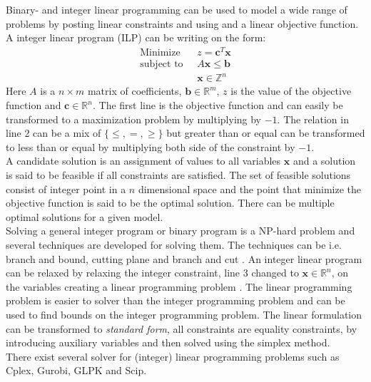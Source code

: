 Binary- and integer linear programming can be used to model a wide range of problems by posting linear constraints and 
using and a linear objective function. A integer linear program (ILP) can be writing on the form: 
\begin{align}
 \text{Minimize }\; &z =  \mathbf{c}^T\mathbf{x} \\ 
 \text{subject to } \; & A\mathbf{x} \leq \mathbf{b} \\ 
 & \mathbf{x} \in \mathbb{Z}^n
\end{align} \noindent
Here $A$ is a $n \times m$ matrix of coefficients, $\mathbf{b} \in \mathbb{R}^m$, $z$ is the value of the objective 
function and $\mathbf{c} \in \mathbb{R}^n$. The first line is the objective function and can easily be transformed to a 
maximization problem by multiplying by $-1$. The relation in line 2 can be a mix of $\{\leq,=,\geq\}$ but greater 
than or equal can be transformed to less than or equal by multiplying both side of the constraint by $-1$.  \\ 
A candidate solution is an assignment of values to all variables $\mathbf{x}$ and a solution is said to be feasible if 
all constraints are satisfied. The set of feasible solutions consist of integer point in a $n$ dimensional space and 
the point that minimize the objective function is said to be the optimal solution. There can be multiple optimal 
solutions for a given model. \\
Solving a general integer program or binary program is a NP-hard problem \cite[p.30]{ilpbog} and several techniques are 
developed for solving them. The techniques can be i.e. branch and bound, cutting plane and branch and cut 
\cite[p.31]{ilpbog}. An integer linear program can be relaxed by relaxing the integer constraint, line 3 changed to 
$\mathbf{x} \in \mathbb{R}^n$, on the variables creating a linear programming problem \cite[p. 30]{ilpbog}. The linear 
programming problem is easier to solver than the integer programming problem and can be used to find bounds on the 
integer programming problem. The linear formulation can be transformed to \emph{standard form}, all constraints are 
equality constraints, by introducing auxiliary variables and then solved using the simplex method. \\ 
There exist several solver for (integer) linear programming problems such as Cplex, Gurobi, GLPK and Scip. 